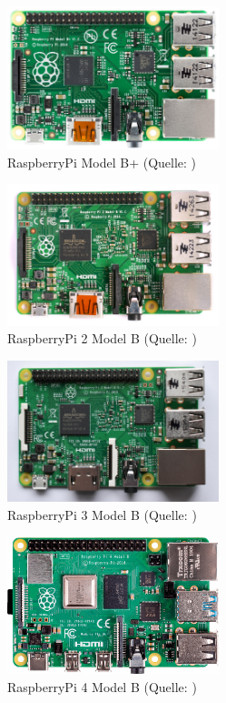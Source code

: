 \begin{figure}[h!]
	\centering
		\includegraphics[width=0.55\textwidth]{./fotos/Raspberry_Pi_B+_top.jpg}
	\caption{RaspberryPi Model B+ (Quelle: \cite{rpibplus})}
	\label{fig:rpibplus}
\end{figure}

\begin{figure}[h!]
	\centering
		\includegraphics[width=0.55\textwidth]{./fotos/Raspberry_Pi_2_Model_B_v1-1_top_new.jpg}
	\caption{RaspberryPi 2 Model B (Quelle: \cite{rpi2b})}
	\label{fig:rpi2b}
\end{figure}

\begin{figure}[h!]
	\centering
		\includegraphics[width=0.55\textwidth]{./fotos/Raspberry_Pi_3_Model_B.jpg}
	\caption{RaspberryPi 3 Model B (Quelle: \cite{rpi3b})}
	\label{fig:rpi3b}
\end{figure}

\begin{figure}[h!]
	\centering
		\includegraphics[width=0.55\textwidth]{./fotos/Raspberry_Pi_4_Model_B.jpg}
	\caption{RaspberryPi 4 Model B (Quelle: \cite{rpi4b})}
	\label{fig:rpi4b}
\end{figure}

